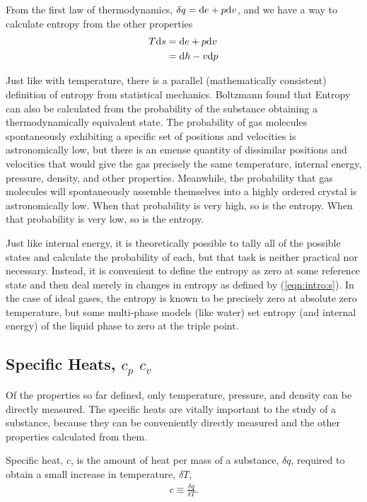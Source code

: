 From the first law of thermodynamics, $\delta q = \mathrm{d} e + p \mathrm{d} v$, and we have a way to calculate entropy from the other properties
\begin{align}
T \mathrm{d} s &= \mathrm{d} e + p\mathrm{d} v\label{eqn:intro:ds1}\\
 &= \mathrm{d} h - v \mathrm{d} p\label{eqn:intro:ds2}
\end{align}

Just like with temperature, there is a parallel (mathematically consistent) definition of entropy from statistical mechanics.  Boltzmann found that Entropy can also be calculated from the probability of the substance obtaining a thermodynamically equivalent state.  The probability of gas molecules spontaneously exhibiting a specific set of positions and velocities is astronomically low, but there is an emense quantity of dissimilar positions and velocities that would give the gas precisely the same temperature, internal energy, pressure, density, and other properties.  Meanwhile, the probability that gas molecules will spontaneously assemble themselves into a highly ordered crystal is astronomically low.  When that probability is very high, so is the entropy.  When that probability is very low, so is the entropy.

Just like internal energy, it is theoretically possible to tally all of the possible states and calculate the probability of each, but that task is neither practical nor necessary.  Instead, it is convenient to define the entropy as zero at some reference state and then deal merely in changes in entropy as defined by (\ref{eqn:intro:s}).  In the case of ideal gases, the entropy is known to be precisely zero at absolute zero temperature, but some multi-phase models (like water) set entropy (and internal energy) of the liquid phase to zero at the triple point.

\subsection{Specific Heats, $c_p$ $c_v$}\label{sec:intro:c}

Of the properties so far defined, only temperature, pressure, and density can be directly measured.  The specific heats are vitally important to the study of a substance, because they can be conveniently directly measured and the other properties calculated from them.

Specific heat, $c$, is the amount of heat per mass of a substance, $\delta q$, required to obtain a small increase in temperature, $\delta T$,
\begin{align}
c \equiv \frac{\delta q}{\delta T}.
\end{align}

